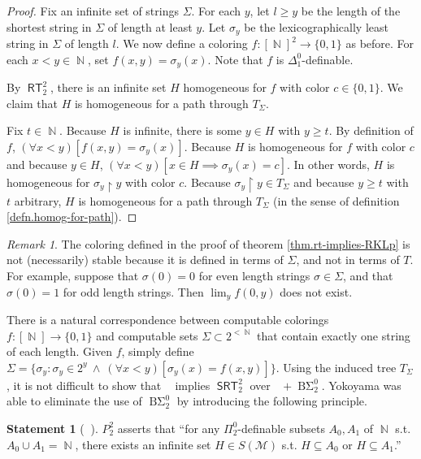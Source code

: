 \documentclass{amsart}
\theoremstyle{plain}
\theoremstyle{remark}
\newtheorem{remark}[theorem]{Remark}
\theoremstyle{definition}
\newtheorem{statement}[theorem]{Statement}
\DeclareMathOperator{\BSigma}{B\Sigma}
\DeclareMathOperator{\RCA}{\mathsf{RCA}_0}
\DeclareMathOperator{\RT}{\mathsf{RT}}
\DeclareMathOperator{\SRT}{\mathsf{SRT}}
\DeclareMathOperator{\RKLp}{\mathsf{RKL}^{(1)}}
\DeclareMathOperator{\N}{\mathbb{N}}
\newcommand{\Pt}{P^2_2}		%
\begin{document}
\begin{proof}
Fix an infinite set of strings $\Sigma$.  
For each $y$, let $l\geq y$ be the length of the shortest string in $\Sigma$ of length at least $y$.  
Let $\sigma_y$ be the lexicographically least string in $\Sigma$ of length $l$.  
We now define a coloring $f:[\N]^2\rightarrow\{0,1\}$ as before.  
For each $x<y\in\N$, set $f(x,y)=\sigma_y(x)$.  Note that $f$ is $\Delta^0_1$-definable.

By $\RT^2_2$, there is an infinite set $H$ homogeneous for $f$ with color $c\in\{0,1\}$.  
We claim that $H$ is homogeneous for a path through $T_{\Sigma}$.

Fix $t\in\N$.  
Because $H$ is infinite, there is some $y\in H$ with $y\geq t$.
By definition of $f$, $(\forall x<y)[f(x,y)=\sigma_y(x)]$.
Because $H$ is homogeneous for $f$ with color $c$ and because $y\in H$,
	$(\forall x<y)[x\in H \implies \sigma_y(x)=c]$.
In other words, $H$ is homogeneous for $\sigma_y\upharpoonright y$ with color $c$.
Because $\sigma_y\upharpoonright y\in T_{\Sigma}$ and because $y\geq t$ with $t$ arbitrary, 
$H$ is homogeneous for a path through $T_{\Sigma}$ (in the sense of definition \ref{defn.homog-for-path}). 
\end{proof}

\begin{remark}
The coloring defined in the proof of theorem \ref{thm.rt-implies-RKLp} is not (necessarily) stable because it is defined in terms of $\Sigma$, and not in terms of $T$.  For example, suppose that $\sigma(0)=0$ for even length strings $\sigma\in\Sigma$, and that $\sigma(0)=1$ for odd length strings.  Then $\lim_y f(0,y)$ does not exist. 
\end{remark}

There is a natural correspondence between computable colorings $f:[\N]\rightarrow\{0,1\}$ and computable sets $\Sigma\subset 2^{<\N}$ that contain exactly one string of each length.  Given $f$, simply define $\Sigma=\{\sigma_y : \sigma_y\in 2^y\ \land\ (\forall x<y)[\sigma_y(x)=f(x,y)]\}$.   
Using the induced tree $T_{\Sigma}$, it is not difficult to show that $\RKLp$ implies $\SRT^2_2$ over $\RCA+\BSigma^0_2$. 
%
Yokoyama was able to eliminate the use of $\BSigma^0_2$ by introducing the following  principle.

\begin{statement}[$\RCA$]
$\Pt$ asserts that 
	``for any $\Pi^0_2$-definable subsets $A_0,A_1$ of $\N$ s.t. $A_0\cup A_1=\N$,
	there exists an infinite set $H\in S(\mathcal{M})$ s.t. $H\subseteq A_0$ or $H\subseteq A_1$.''
\end{statement}
\end{document}
